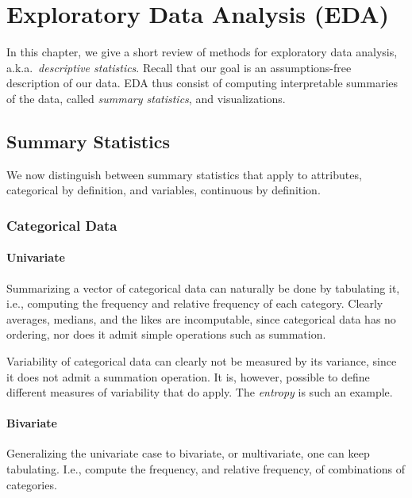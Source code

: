 \documentclass[12pt,a4paper]{report}
\begin{document}
\chapter{Exploratory Data Analysis (EDA)}
In this chapter, we give a short review of methods for exploratory data analysis, a.k.a.\ \emph{descriptive statistics}.
Recall that our goal is an assumptions-free description of our data. 
EDA thus consist of computing interpretable summaries of the data, called \emph{summary statistics}, and visualizations. 


\section{Summary Statistics}
We now distinguish between summary statistics that apply to attributes, categorical by definition, and variables, continuous by definition. 


\subsection{Categorical Data}

\subsubsection{Univariate}
Summarizing a vector of categorical data can naturally be done by tabulating it, i.e., computing the frequency and relative frequency of each category.
Clearly averages, medians, and the likes are incomputable, since categorical data has no ordering, nor does it admit simple operations such as summation.

\begin{extra}
Variability of categorical data can clearly not be measured by its variance, since it does not admit a summation operation.
It is, however, possible to define different measures of variability that do apply.
The \emph{entropy} is such an example.
\end{extra}


\subsubsection{Bivariate}
Generalizing the univariate case to bivariate, or multivariate, one can keep tabulating. I.e., compute the frequency, and relative frequency, of combinations of categories.
\end{document}
